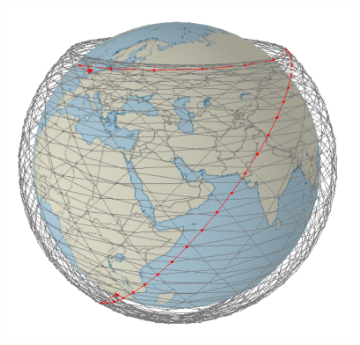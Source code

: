 \documentclass[12pt,a4paper,twoside,openright]{report}
\begin{document}
\begin{figure}
	\centering
	\caption{Screenshots of my program simulating the shortest path between two nodes through different linking methods and rates of satellite failure, the highlighted path is the shortest path between the two base stations.}
	\label{fig:Screenshots}
	\begin{subfigure}[b]{\textwidth}
		\includegraphics[width=\textwidth]{LDN-JHB-H0-1}
	\end{subfigure}
	

\end{figure}
\end{document}
